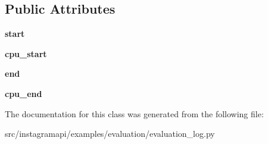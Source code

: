 \subsection*{Public Attributes}
\begin{DoxyCompactItemize}
\item 
\mbox{\label{classexamples_1_1evaluation_1_1evaluation__log_1_1_evaluation_log_a08abc46e1558df6509c2f355c86b8a6d}} 
{\bfseries start}
\item 
\mbox{\label{classexamples_1_1evaluation_1_1evaluation__log_1_1_evaluation_log_a024b73261890691524244d0a9d8b227e}} 
{\bfseries cpu\+\_\+start}
\item 
\mbox{\label{classexamples_1_1evaluation_1_1evaluation__log_1_1_evaluation_log_ac492f5c7ae0da3f96d38603542cf89e0}} 
{\bfseries end}
\item 
\mbox{\label{classexamples_1_1evaluation_1_1evaluation__log_1_1_evaluation_log_a1e7d17f9f3b180554d9550489eb4d9f1}} 
{\bfseries cpu\+\_\+end}
\end{DoxyCompactItemize}


The documentation for this class was generated from the following file\+:\begin{DoxyCompactItemize}
\item 
src/instagramapi/examples/evaluation/evaluation\+\_\+log.\+py\end{DoxyCompactItemize}
